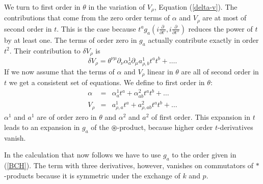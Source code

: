 \documentclass[a4paper,11pt]{article}
\def\nn{\nonumber }
\def\pat{\partial}
\begin{document}
We turn to first order in $\theta$ in the variation of $V_{\rho}$, Equation (\ref{delta-v}). 
The contributions that come
from the zero order terms of $\alpha$ and $V_{\rho}$ are at most of 
second order in $t$. This is the case because 
$t^ag_a(i\frac{\pat}{\pat t'},i\frac{\pat}{\pat t''})$ reduces 
the power of $t$ by at least one. 
The terms of order zero in $g_a$ actually contribute exactly in order $t^2$.
Their contribution to $\delta V_{\rho}$ is
\begin{equation}
  \delta V_{\rho}=\theta^{\nu\mu}\pat_{\nu}\alpha_a^1\pat_{\mu}a^1_{\rho,b}t^at^b+\ldots.
\end{equation}
If we now assume that the terms of $\alpha$ and $V_{\rho}$ linear  
in $\theta$ are all of second order in $t$ we get a consistent
set of equations. We define to first order in $\theta$: 
\begin{eqnarray}
  \alpha&=&\alpha^{1}_at^a+\alpha^{2}_{ab}t^at^b+\ldots\nn\\
  V_{\rho}&=&a^{1}_{\rho,a}t^a+a^{2}_{\rho,ab}t^at^b+\ldots
\end{eqnarray}
$\alpha^{1}$ and $a^{1}$ are of order zero in $\theta$ and $\alpha^{2}$ 
and $a^{2}$ of first order. This expansion in $t$ leads to an
expansion in $g_a$ of the $\circledast$-product, because higher order $t$-derivatives vanish.

In the calculation that now follows we have to
use $g_a$ to the order given in (\ref{BCH}). The term with
three derivatives, however, vanishes on commutators of $*$-products 
because it is symmetric under the exchange 
of $k$ and $p$.
\end{document}
